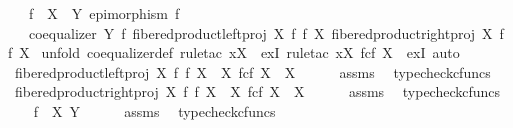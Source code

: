 \begin{isabellebody}
\ \ \ {\isachardoublequoteopen}f\ {\isacharcolon}{\kern0pt}\ X\ {\isasymrightarrow}\ Y{\isachardoublequoteclose}\ {\isachardoublequoteopen}epimorphism\ f{\isachardoublequoteclose}\isanewline
\ \ \ {\isachardoublequoteopen}coequalizer\ Y\ f\ {\isacharparenleft}{\kern0pt}fibered{\isacharunderscore}{\kern0pt}product{\isacharunderscore}{\kern0pt}left{\isacharunderscore}{\kern0pt}proj\ X\ f\ f\ X{\isacharparenright}{\kern0pt}\ {\isacharparenleft}{\kern0pt}fibered{\isacharunderscore}{\kern0pt}product{\isacharunderscore}{\kern0pt}right{\isacharunderscore}{\kern0pt}proj\ X\ f\ f\ X{\isacharparenright}{\kern0pt}{\isachardoublequoteclose}\isanewline
%
\isadelimproof
%
\endisadelimproof
%
\isatagproof
{}\isamarkupfalse%
\ {\isacharparenleft}{\kern0pt}unfold\ coequalizer{\isacharunderscore}{\kern0pt}def{\isacharcomma}{\kern0pt}\ rule{\isacharunderscore}{\kern0pt}tac\ x{\isacharequal}{\kern0pt}X\ \ exI{\isacharcomma}{\kern0pt}\ rule{\isacharunderscore}{\kern0pt}tac\ x{\isacharequal}{\kern0pt}{\isachardoublequoteopen}X\ \isactrlbsub f\isactrlesub {\isasymtimes}\isactrlsub c\isactrlbsub f\isactrlesub \ X{\isachardoublequoteclose}\ \ exI{\isacharcomma}{\kern0pt}\ auto{\isacharparenright}{\kern0pt}\isanewline
\ \ \isamarkupfalse%
\ {\isachardoublequoteopen}fibered{\isacharunderscore}{\kern0pt}product{\isacharunderscore}{\kern0pt}left{\isacharunderscore}{\kern0pt}proj\ X\ f\ f\ X\ {\isacharcolon}{\kern0pt}\ X\ \isactrlbsub f\isactrlesub {\isasymtimes}\isactrlsub c\isactrlbsub f\isactrlesub \ X\ {\isasymrightarrow}\ X{\isachardoublequoteclose}\isanewline
\ \ \ \ \isamarkupfalse%
\ assms\ \isamarkupfalse%
\ typecheck{\isacharunderscore}{\kern0pt}cfuncs\isanewline
\ \ \isamarkupfalse%
\ {\isachardoublequoteopen}fibered{\isacharunderscore}{\kern0pt}product{\isacharunderscore}{\kern0pt}right{\isacharunderscore}{\kern0pt}proj\ X\ f\ f\ X\ {\isacharcolon}{\kern0pt}\ X\ \isactrlbsub f\isactrlesub {\isasymtimes}\isactrlsub c\isactrlbsub f\isactrlesub \ X\ {\isasymrightarrow}\ X{\isachardoublequoteclose}\isanewline
\ \ \ \ \isamarkupfalse%
\ assms\ \isamarkupfalse%
\ typecheck{\isacharunderscore}{\kern0pt}cfuncs\isanewline
\ \ \isamarkupfalse%
\ {\isachardoublequoteopen}f\ {\isacharcolon}{\kern0pt}\ X\ {\isasymrightarrow}Y{\isachardoublequoteclose}\isanewline
\ \ \ \ \isamarkupfalse%
\ assms\ \isamarkupfalse%
\ typecheck{\isacharunderscore}{\kern0pt}cfuncs\isanewline

\end{isabellebody}
